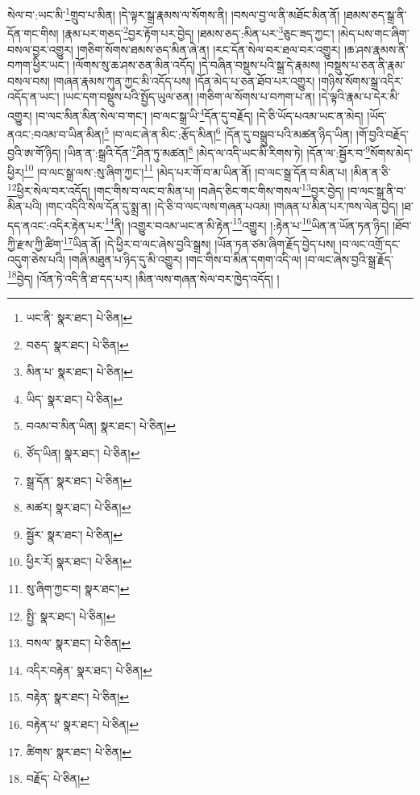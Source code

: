 སེལ་བ་:ཡང་མི་\footnote{ཡང་ནི་  སྣར་ཐང་།  པེ་ཅིན། }གྲུབ་པ་མིན། །དེ་ལྟར་སྒྲ་རྣམས་ལ་སོགས་ནི། །བསལ་བྱ་ལ་ནི་མཐོང་མིན་ནོ། །ཐམས་ཅད་སྒྲ་ནི་དོན་གང་གིས། །རྣམ་པར་གཅད་\footnote{བཅད་  སྣར་ཐང་།  པེ་ཅིན། }བྱར་རྟོག་པར་བྱེད། །ཐམས་ཅད་:མིན་པར་\footnote{མིན་པ་  སྣར་ཐང་།  པེ་ཅིན། }ཅུང་ཟད་ཀྱང་། །མེད་པས་གང་ཞིག་བསལ་བྱར་འགྱུར། །གཅིག་སོགས་ཐམས་ཅད་མིན་ཞེ་ན། །རང་དོན་སེལ་བར་ཐལ་བར་འགྱུར། །ཆ་ཤས་རྣམས་ནི་བཀག་ཕྱིར་ཡང་། །ལོགས་སུ་ཆ་ཤས་ཅན་མིན་འདོད། །དེ་བཞིན་བསྡུས་པའི་སྒྲ་དེ་རྣམས། །བསྡུས་པ་ཅན་ནི་རྣམ་བསལ་བས། །གཞན་རྣམས་ཀུན་ཀྱང་མི་འདོད་པས། །དོན་མེད་པ་ཅན་ཐོབ་པར་འགྱུར། །གཉིས་སོགས་སྒྲ་འདིར་འདོད་ན་ཡང་། །ཡང་དག་བསྡུས་པའི་སྤྱོད་ཡུལ་ཅན། །གཅིག་ལ་སོགས་པ་བཀག་པ་ན། །དེ་ལྟའི་རྣམ་པ་དེར་མི་འགྱུར། །བ་ལང་མིན་མིན་སེལ་བ་གང་། །བ་ལང་སྒྲ་ཡི་\footnote{ཡིད་  སྣར་ཐང་།  པེ་ཅིན། }དོན་དུ་བརྗོད། །དེ་ཅི་ཡོད་པའམ་ཡང་ན་མེད། །ཡོད་ནའང་:བའམ་བ་ཡིན་མིན།\footnote{བའམ་བ་མིན་ཡིན།  སྣར་ཐང་།  པེ་ཅིན། } །བ་ལང་ཞེ་ན་མིང་:རྩོད་མིན།\footnote{ཙོད་ཡིན།  སྣར་ཐང་།  པེ་ཅིན། } །དོན་དུ་བསྒྲུབ་པའི་མཚན་ཉིད་ཡིན། །གོ་བྱའི་བརྗོད་བྱའི་ཨ་གོ་ཉིད། །ཡིན་ན་:སྒྲའི་དོན་\footnote{སྒྲ་དོན་  སྣར་ཐང་།  པེ་ཅིན། }ཤིན་ཏུ་མཚན།\footnote{མཚར།  སྣར་ཐང་།  པེ་ཅིན། } །མེད་ལ་འདི་ཡང་མི་རིགས་ཏེ། །དོན་ལ་:སྦྱོར་བ་\footnote{སྦྱོར་  སྣར་ཐང་།  པེ་ཅིན། }སོགས་མེད་ཕྱིར།\footnote{ཕྱིར་རོ།  སྣར་ཐང་།  པེ་ཅིན། } །བ་ལང་སྒྲ་ལས་:སུ་ཞིག་ཀྱང་།\footnote{སུ་ཞིག་ཀྱང་བ།  སྣར་ཐང་། } །མེད་པར་གོ་བ་མ་ཡིན་ནོ། །བ་ལང་སྒྲ་དོན་བ་མིན་པ། །མིན་ན་ཅི་\footnote{སྤྱི་  སྣར་ཐང་།  པེ་ཅིན། }ཕྱིར་སེལ་བར་འདོད། །གང་གིས་བ་ལང་བ་མིན་པ། །བཞེད་ཅིང་གང་གིས་གསལ་\footnote{བསལ་  སྣར་ཐང་།  པེ་ཅིན། }བྱར་བྱེད། །བ་ལང་སྒྲ་ནི་བ་མིན་པའི། །གང་འདིའི་སེལ་དོན་དུ་སྨྲ་ན། །དེ་ཅི་བ་ལང་ལས་གཞན་པའམ། །གཞན་པ་མིན་པར་ཁས་ལེན་བྱེད། །ཐ་དད་ནའང་:འདིར་རྟེན་པར་\footnote{འདིར་བརྟེན་  སྣར་ཐང་།  པེ་ཅིན། }ནི། །འགྱུར་བའམ་ཡང་ན་མི་རྟེན་\footnote{བརྟེན་  སྣར་ཐང་།  པེ་ཅིན། }འགྱུར། །:རྟེན་པ་\footnote{བརྟེན་པ་  སྣར་ཐང་།  པེ་ཅིན། }ཡིན་ན་ཡོན་ཏན་ཉིད། །ཐོབ་ཀྱི་རྫས་ཀྱི་ཚིག་\footnote{ཚིགས་  སྣར་ཐང་།  པེ་ཅིན། }ཡིན་ནོ། །དེ་ཕྱིར་བ་ལང་ཞེས་བྱའི་སྒྲས། །ཡོན་ཏན་ཙམ་ཞིག་རྗོད་བྱེད་པས། །བ་ལང་འགྲོ་དང་འདུག་ཅེས་པའི། །གཞི་མཐུན་པ་ཉིད་དུ་མི་འགྱུར། །གང་གིས་བ་མིན་དགག་འདི་ལ། །བ་ལང་ཞེས་བྱའི་སྒྲ་རྗོད་\footnote{བརྗོད་  པེ་ཅིན། }བྱེད། །འོན་ཏེ་འདི་ནི་ཐ་དད་པར། །མིན་ལས་གཞན་སེལ་བར་ཁྱེད་འདོད། །
